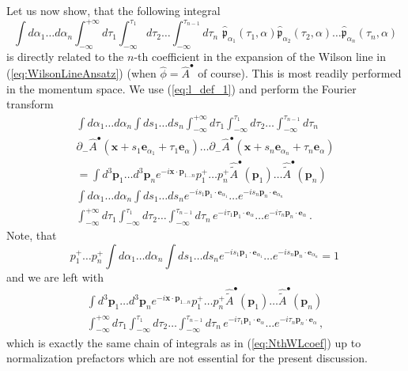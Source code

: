 \documentclass[english,american]{article}
\begin{document}
Let us now show, that the following integral 
\begin{equation}
\int d\alpha_{1}\dots d\alpha_{n}\int_{-\infty}^{+\infty}d\tau_{1}\int_{-\infty}^{\tau_{1}}d\tau_{2}\dots
\int_{-\infty}^{\tau_{n-1}}d\tau_{n}\,\,\hat{\mathfrak{p}}_{\alpha_{1}}\left(\tau_{1},\alpha\right)\hat{\mathfrak{p}}_{\alpha_{2}}\left(\tau_{2},\alpha\right)\dots\hat{\mathfrak{p}}_{\alpha_{n}}\left(\tau_{n},\alpha\right)\label{eq:Wilson_pvec}
\end{equation}
is directly related to the $n$-th coefficient in the expansion of
the Wilson line in (\ref{eq:WilsonLineAnsatz}) (when $\hat{\phi}=\hat{A}^{\bullet}$
of course). This is most readily performed in the momentum space. We use (\ref{eq:l_def_1})
and perform the Fourier transform
\begin{multline}
\int d\alpha_{1}\dots d\alpha_{n}\int ds_{1}\dots ds_{n}\int_{-\infty}^{+\infty}d\tau_{1}\int_{-\infty}^{\tau_{1}}d\tau_{2}\dots\int_{-\infty}^{\tau_{n-1}}d\tau_{n}\,\\
\partial_{-}\hat{A}^{\bullet}\left(\mathbf{x}+s_{1}\mathbf{e}_{\alpha_{1}}+\tau_{1}\mathbf{e}_{\alpha}\right)\dots\partial_{-}\hat{A}^{\bullet}\left(\mathbf{x}+s_{n}\mathbf{e}_{\alpha_{n}}+\tau_{n}\mathbf{e}_{\alpha}\right)\\
=\int d^{3}\mathbf{p}_{1}\dots d^{3}\mathbf{p}_{n}e^{-i\mathbf{x}\cdot\mathbf{p}_{1\dots n}}p_{1}^{+}\dots p_{n}^{+}\hat{\tilde{A}}^{\bullet}\left(\mathbf{p}_{1}\right)\dots\hat{\tilde{A}}^{\bullet}\left(\mathbf{p}_{n}\right)\\
\int d\alpha_{1}\dots d\alpha_{n}\int ds_{1}\dots ds_{n}e^{-is_{1}\mathbf{p}_{1}\cdot\mathbf{e}_{\alpha_{1}}}\dots e^{-is_{n}\mathbf{p}_{n}\cdot\mathbf{e}_{\alpha_{n}}}\\
\int_{-\infty}^{+\infty}d\tau_{1}\int_{-\infty}^{\tau_{1}}d\tau_{2}\dots\int_{-\infty}^{\tau_{n-1}}d\tau_{n}\, e^{-i\tau_{1}\mathbf{p}_{1}\cdot\mathbf{e}_{\alpha}}\dots e^{-i\tau_{n}\mathbf{p}_{n}\cdot\mathbf{e}_{\alpha}}\,.
\end{multline}
Note, that 
\begin{equation}
p_{1}^{+}\dots p_{n}^{+}\int d\alpha_{1}\dots d\alpha_{n}\int ds_{1}\dots ds_{n}e^{-is_{1}\mathbf{p}_{1}\cdot\mathbf{e}_{\alpha_{1}}}\dots e^{-is_{n}\mathbf{p}_{n}\cdot\mathbf{e}_{\alpha_{n}}}=1\,
\end{equation}
and we are left with
\begin{multline}
\int d^{3}\mathbf{p}_{1}\dots d^{3}\mathbf{p}_{n}e^{-i\mathbf{x}\cdot\mathbf{p}_{1\dots n}}p_{1}^{+}\dots p_{n}^{+}\hat{\tilde{A}}^{\bullet}\left(\mathbf{p}_{1}\right)\dots\hat{\tilde{A}}^{\bullet}\left(\mathbf{p}_{n}\right)\\
\int_{-\infty}^{+\infty}d\tau_{1}\int_{-\infty}^{\tau_{1}}d\tau_{2}\dots\int_{-\infty}^{\tau_{n-1}}d\tau_{n}\, e^{-i\tau_{1}\mathbf{p}_{1}\cdot\mathbf{e}_{\alpha}}\dots e^{-i\tau_{n}\mathbf{p}_{n}\cdot\mathbf{e}_{\alpha}}\,,
\end{multline}
which is exactly the same chain of integrals as in (\ref{eq:NthWLcoef}) up to normalization prefactors which are not essential for the present discussion.
\end{document}
